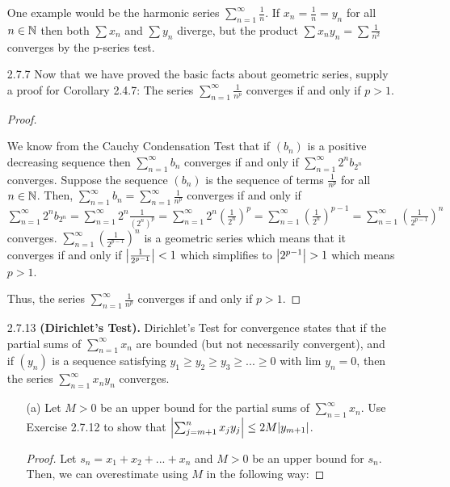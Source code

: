\documentclass[12pt,letterpaper]{article}
\begin{document}
\begin{itemize}[leftmargin=!,labelindent=5pt]
    One example would be the harmonic series $\sum_{n=1}^{\infty} \frac{1}{n}$.
    If $x_n = \frac{1}{n} = y_n$ for all $n \in \mathbb{N}$ then both $\sum x_n$ and $\sum y_n$ diverge, but the product $\sum x_ny_n = \sum \frac{1}{n^2}$ converges by the p-series test.
    \item [2.7.7] Now that we have proved the basic facts about geometric series, supply a proof for Corollary 2.4.7: The series $\sum_{n=1}^{\infty} \frac{1}{n^p}$ converges if and only if $p > 1$.
        \begin{proof}
            \begin{spacing}{1.2}
                We know from the Cauchy Condensation Test that if $(b_n)$ is a positive decreasing sequence then $\sum_{n=1}^{\infty}b_n$ converges if and only if $\sum_{n=1}^{\infty}2^n b_{2^n}$ converges.
                Suppose the sequence $(b_n)$ is the sequence of terms $\frac{1}{n^p}$ for all $n\in \mathbb{N}$.
                Then, $\sum_{n=1}^{\infty}b_n = \sum_{n=1}^{\infty} \frac{1}{n^p}$ converges if and only if $\sum_{n=1}^{\infty}2^n b_{2^n} = \sum_{n=1}^{\infty}2^n \frac{1}{(2^n)^p} = 
                \sum_{n=1}^{\infty}2^n (\frac{1}{2^n})^p = \sum_{n=1}^{\infty}(\frac{1}{2^n})^{p-1} = \sum_{n=1}^{\infty}(\frac{1}{2^{p-1}})^n$ converges. 
                $\sum_{n=1}^{\infty}(\frac{1}{2^{p-1}})^n$ is a geometric series which means that it converges if and only if $\abs{\frac{1}{2^{p-1}}} < 1$ which simplifies to $\abs{2^{p-1}} > 1$ which means $p > 1$.
            \end{spacing}
                Thus, the series $\sum_{n=1}^{\infty} \frac{1}{n^p}$ converges if and only if $p > 1$.
        \end{proof}
    \item [2.7.13] \textbf{(Dirichlet’s Test).} Dirichlet’s Test for convergence states that if the partial sums of $\sum_{n=1}^{\infty} x_n$ are bounded (but not necessarily convergent), and if $(y_n)$ is a sequence satisfying $y_1 \geq y_2 \geq y_3 \geq ... \geq 0$ with lim $y_n = 0$, then the series $\sum_{n=1}^{\infty} x_n y_n$ converges.
        \begin{itemize}
            \item [(a)] Let $M > 0$ be an upper bound for the partial sums of $\sum_{n=1}^{\infty}x_n$. Use Exercise 2.7.12 to show that $\abs{\sum_{j=m+1}^{n} x_j y_j} \leq 2M \abs{y_{m+1}}$.
                \begin{proof}
                    Let $s_n = x_1 + x_2 + ... + x_n$ and $M > 0$ be an upper bound for $s_n$. Then, we can overestimate using $M$ in the following way:

\end{proof}
\end{itemize}
\end{itemize}
\end{document}
